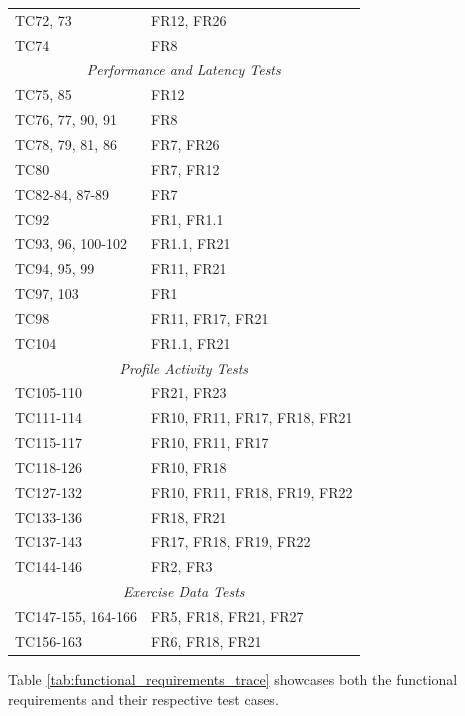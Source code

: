 \documentclass[12pt, titlepage]{article}
\begin{document}
\begin{longtable}{p{}p{}}
  TC72, 73 & FR12, FR26 \\
  TC74 & FR8 \\
  \midrule
  \multicolumn{2}{c}{\textit{Performance and Latency Tests}} \\
  \midrule
  TC75, 85 & FR12 \\
  TC76, 77, 90, 91 & FR8 \\
  TC78, 79, 81, 86 & FR7, FR26 \\
  TC80 & FR7, FR12 \\
  TC82-84, 87-89 & FR7 \\
  TC92 & FR1, FR1.1 \\
  TC93, 96, 100-102 & FR1.1, FR21 \\
  TC94, 95, 99 & FR11, FR21 \\
  TC97, 103 & FR1 \\
  TC98 & FR11, FR17, FR21 \\
  TC104 & FR1.1, FR21 \\
  \midrule
  \multicolumn{2}{c}{\textit{Profile Activity Tests}} \\
  \midrule
  TC105-110 & FR21, FR23 \\
  TC111-114 & FR10, FR11, FR17, FR18, FR21 \\
  TC115-117 & FR10, FR11, FR17 \\
  TC118-126 & FR10, FR18 \\
  TC127-132 & FR10, FR11, FR18, FR19, FR22 \\
  TC133-136 & FR18, FR21 \\
  TC137-143 & FR17, FR18, FR19, FR22 \\
  TC144-146 & FR2, FR3 \\
  \midrule
  \multicolumn{2}{c}{\textit{Exercise Data Tests}} \\
  \midrule
  TC147-155, 164-166 & FR5, FR18, FR21, FR27 \\
  TC156-163 & FR6, FR18, FR21 \\
\end{longtable}

Table \ref{tab:functional_requirements_trace} showcases both the functional requirements and their respective test cases.
\end{document}
